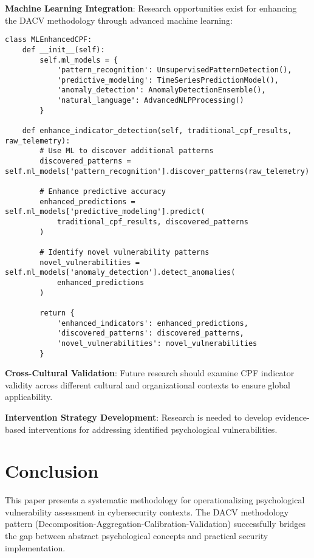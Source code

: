 \documentclass[11pt, onecolumn]{article}
\begin{document}
\textbf{Machine Learning Integration}:
Research opportunities exist for enhancing the DACV methodology through advanced machine learning:

\begin{lstlisting}
class MLEnhancedCPF:
    def __init__(self):
        self.ml_models = {
            'pattern_recognition': UnsupervisedPatternDetection(),
            'predictive_modeling': TimeSeriesPredictionModel(),
            'anomaly_detection': AnomalyDetectionEnsemble(),
            'natural_language': AdvancedNLPProcessing()
        }
        
    def enhance_indicator_detection(self, traditional_cpf_results, raw_telemetry):
        # Use ML to discover additional patterns
        discovered_patterns = self.ml_models['pattern_recognition'].discover_patterns(raw_telemetry)
        
        # Enhance predictive accuracy
        enhanced_predictions = self.ml_models['predictive_modeling'].predict(
            traditional_cpf_results, discovered_patterns
        )
        
        # Identify novel vulnerability patterns
        novel_vulnerabilities = self.ml_models['anomaly_detection'].detect_anomalies(
            enhanced_predictions
        )
        
        return {
            'enhanced_indicators': enhanced_predictions,
            'discovered_patterns': discovered_patterns,
            'novel_vulnerabilities': novel_vulnerabilities
        }
\end{lstlisting}

\textbf{Cross-Cultural Validation}:
Future research should examine CPF indicator validity across different cultural and organizational contexts to ensure global applicability.

\textbf{Intervention Strategy Development}:
Research is needed to develop evidence-based interventions for addressing identified psychological vulnerabilities.

\section{Conclusion}

This paper presents a systematic methodology for operationalizing psychological vulnerability assessment in cybersecurity contexts. The DACV methodology pattern (Decomposition-Aggregation-Calibration-Validation) successfully bridges the gap between abstract psychological concepts and practical security implementation.
\end{document}
